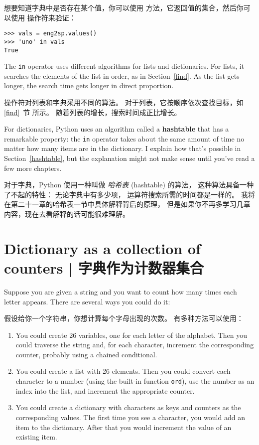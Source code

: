 想要知道字典中是否存在某个值，你可以使用  方法，它返回值的集合，然后你可以使用  操作符来验证：

  

\begin{lstlisting}
>>> vals = eng2sp.values()
>>> 'uno' in vals
True
\end{lstlisting}

%
The {\tt in} operator uses different algorithms for lists and
dictionaries.  For lists, it searches the elements of the list in
order, as in Section~\ref{find}.  As the list gets longer, the search
time gets longer in direct proportion.

 操作符对列表和字典采用不同的算法。
对于列表，它按顺序依次查找目标，如 \ref{find}~节 所示。
随着列表的增长，搜索时间成正比增长。

For dictionaries, Python uses an
algorithm called a {\bf hashtable} that has a remarkable property: the
{\tt in} operator takes about the same amount of time no matter how
many items are in the dictionary.  I explain how that's possible
in Section~\ref{hashtable}, but the explanation might not make
sense until you've read a few more chapters.

对于字典，Python 使用一种叫做 {\em 哈希表} (hashtable) 的算法，
这种算法具备一种了不起的特性： 无论字典中有多少项，  运算符搜索所需的时间都是一样的。 我将在第二十一章的哈希表一节中具体解释背后的原理，
但是如果你不再多学习几章内容，现在去看解释的话可能很难理解。

\section{Dictionary as a collection of counters  |  字典作为计数器集合}
\label{histogram}

Suppose you are given a string and you want to count how many
times each letter appears.  There are several ways you could do it:

假设给你一个字符串，你想计算每个字母出现的次数。
有多种方法可以使用：

\begin{enumerate}

\item You could create 26 variables, one for each letter of the
alphabet.  Then you could traverse the string and, for each
character, increment the corresponding counter, probably using
a chained conditional.

\item You could create a list with 26 elements.  Then you could
convert each character to a number (using the built-in function
{\tt ord}), use the number as an index into the list, and increment
the appropriate counter.

\item You could create a dictionary with characters as keys
and counters as the corresponding values.  The first time you
see a character, you would add an item to the dictionary.  After
that you would increment the value of an existing item.

\end{enumerate}

